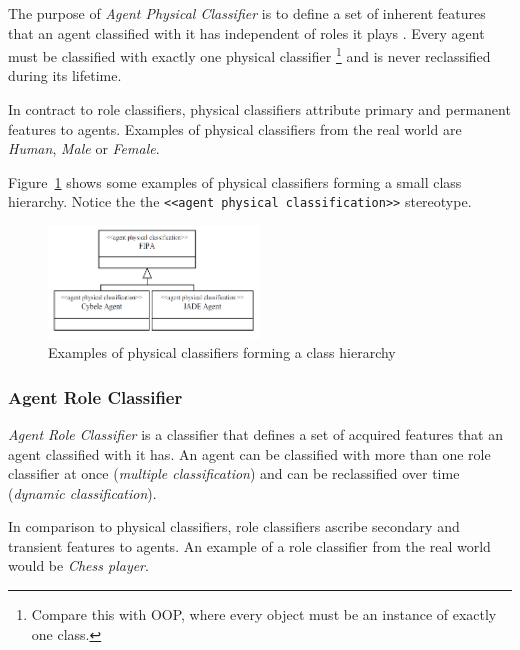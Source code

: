 The purpose of \textit{Agent Physical Classifier} is to define a set of inherent features that an agent classified with it has independent of roles it plays \cite{Odell05}.
Every agent must be classified with exactly one physical classifier
\footnote{Compare this with OOP, where every object must be an instance of exactly one class.} and is never reclassified during its lifetime.

In contract to role classifiers, physical classifiers attribute primary and permanent features to agents.
Examples of physical classifiers from the real world are \textit{Human}, \textit{Male} or \textit{Female}.

Figure~\ref{figure:onp-physical-classifier-examples} shows some examples of physical classifiers forming a small class hierarchy.
Notice the the \texttt{<<agent physical classification>>} stereotype.

\begin{figure}[ht]
	\centering
	\includegraphics[width=0.5\textwidth]{images/onp/physical-classifier-examples.png}
	\caption{Examples of physical classifiers forming a class hierarchy \cite{Odell05}}
	\label{figure:onp-physical-classifier-examples}
\end{figure}

\subsubsection*{Agent Role Classifier}

\textit{Agent Role Classifier} is a classifier that defines a set of acquired features that an agent classified with it has.
An agent can be classified with more than one role classifier at once (\textit{multiple classification}) and can be reclassified over time (\textit{dynamic classification}).

In comparison to physical classifiers, role classifiers ascribe secondary and transient features to agents.
An example of a role classifier from the real world would be \textit{Chess player}.

